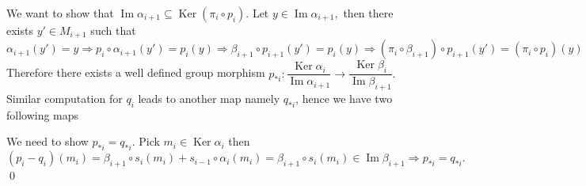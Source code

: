 \documentclass[11pt]{amsart}
\DeclareMathOperator{\im}{\text{Im}}
\DeclareMathOperator{\Ker}{\text{Ker}}
\begin{document}
We want to show that $\im\alpha_{i+1}\subseteq \Ker(\pi_i\circ p_i).$ Let $y\in \im\alpha_{i+1},$ then there exists $y'\in M_{i+1}$ such that $\alpha_{i+1}(y')=y \Rightarrow p_i\circ \alpha_{i+1}(y')=p_i(y) \Rightarrow \beta_{i+1}\circ p_{i+1}(y')=p_i(y) \Rightarrow (\pi_i\circ \beta_{i+1})\circ p_{i+1}(y')=(\pi_i\circ p_i)(y)\Rightarrow 0=(\pi_i\circ p_i)(y) \Rightarrow y\in\Ker(\pi_i\circ p_i).$ Therefore there exists a well defined group morphism $p_{*i}:\dfrac{\Ker\alpha_i}{\im\alpha_{i+1}}\to \dfrac{\Ker\beta_i}{\im\beta_{i+1}}.$ Similar computation for $q_i$ leads to another map namely $q_{*i}$, hence we have two following maps  \begin{center}


\end{center}
We need to show $p_{*i}=q_{*i}.$ Pick $m_i\in \Ker \alpha_i$ then $(p_i-q_i)(m_i)=\beta_{i+1}\circ s_i(m_i)+s_{i-1}\circ\alpha_i(m_i)=\beta_{i+1}\circ s_i(m_i)\in \im\beta_{i+1} \Rightarrow p_{*i}=q_{*i}.$ \qed
\end{document}
